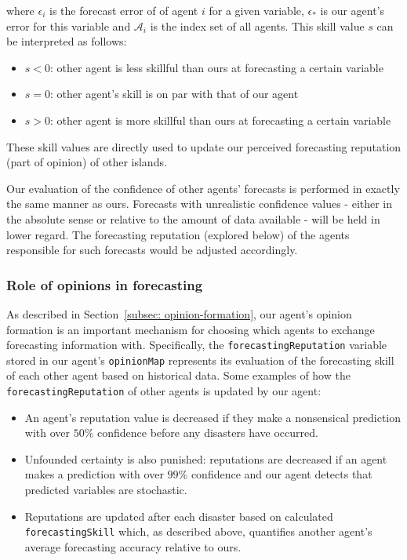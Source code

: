 where $\epsilon_i$ is the forecast error of of agent $i$ for a given variable, $\epsilon_*$ is our agent's error for this variable and $\mathcal{A}_i$ is the index set of all agents. This skill value $s$ can be interpreted as follows:

\begin{itemize}
    \item $s < 0$: other agent is less skillful than ours at forecasting a certain variable
    \item $s = 0$: other agent's skill is on par with that of our agent
    \item $s > 0$: other agent is more skillful than ours at forecasting a certain variable 
\end{itemize}

These skill values are directly used to update our perceived forecasting reputation (part of opinion) of other islands.

Our evaluation of the confidence of other agents' forecasts is performed in exactly the same manner as ours. Forecasts with unrealistic confidence values - either in the absolute sense or relative to the amount of data available - will be held in lower regard. The forecasting reputation (explored below) of the agents responsible for such forecasts would be adjusted accordingly. 

\subsubsection{Role of opinions in forecasting}
As described in Section~\ref{subsec: opinion-formation}, our agent's opinion formation is an important mechanism for choosing which agents to exchange forecasting information with. Specifically, the \texttt{forecastingReputation} variable stored in our agent's \texttt{opinionMap} represents its evaluation of the forecasting skill of each other agent based on historical data. Some examples of how the \texttt{forecastingReputation} of other agents is updated by our agent:
\begin{itemize}
    \item An agent's reputation value is decreased if they make a nonsensical prediction with over $50\%$ confidence before any disasters have occurred.
    \item Unfounded certainty is also punished: reputations are decreased if an agent makes a prediction with over $99\%$ confidence and our agent detects that predicted variables are stochastic.
    \item Reputations are updated after each disaster based on calculated \texttt{forecastingSkill} which, as described above, quantifies another agent's average forecasting accuracy relative to ours. 
\end{itemize}

